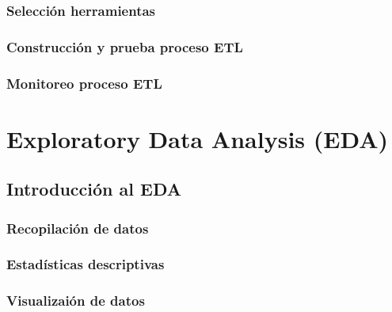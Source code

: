 \documentclass{report}
\begin{document}
\subsection{Selección herramientas}


\subsection{Construcción y prueba proceso ETL}


\subsection{Monitoreo proceso ETL}


\chapter{Exploratory Data Analysis (EDA)}

\section{Introducción al EDA}


\subsection{Recopilación de datos}


\subsection{Estadísticas descriptivas}


\subsection{Visualizaión de datos}


%

%

%



\end{document}
